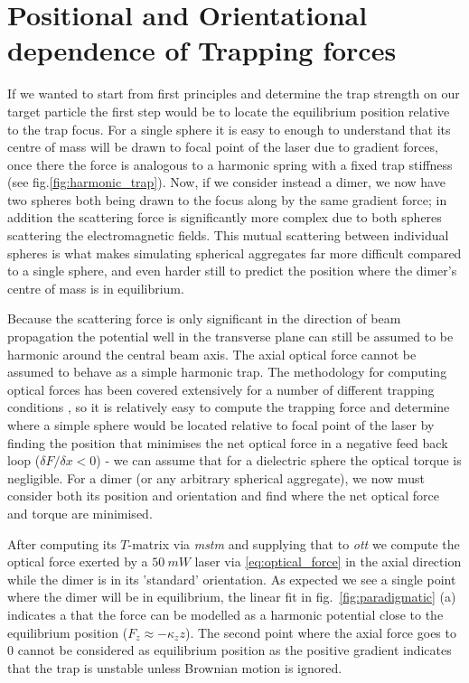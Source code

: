 \section{Positional and Orientational dependence of Trapping forces}
\label{sec:eq_positions}
If we wanted to start from first principles and determine the trap strength 
on our target particle the first step would be to locate the equilibrium position
relative to the trap focus. For a single sphere it is easy to enough to understand 
that its centre of mass will be drawn to focal point of the laser due to gradient
forces, once there the force is analogous to a harmonic spring with a fixed trap
stiffness (see fig.\ref{fig:harmonic_trap}). Now, if we consider instead a dimer, 
we now have two spheres both being drawn to the focus along by the same gradient 
force; in addition the scattering force is significantly more complex due to both 
spheres scattering the electromagnetic fields. This mutual scattering between individual 
spheres is what makes simulating spherical aggregates far more difficult compared
to a single sphere, and even harder still to predict the position where the dimer's 
centre of mass is in equilibrium.

Because the scattering force is only significant in the direction of beam 
propagation the potential well in the transverse plane can still be assumed 
to be harmonic around the central beam axis. The axial optical force cannot 
be assumed to behave as a simple harmonic trap. The methodology for computing 
optical forces has been covered extensively for a number of different trapping 
conditions \cite{RanhaNeves2019}, so it is relatively easy to compute the 
trapping force and determine where a simple sphere would be located relative 
to focal point of the laser by finding the position that minimises the net 
optical force in a negative feed back loop ($\delta F/\delta x < 0$) - we can 
assume that for a dielectric sphere the optical torque is negligible. For a 
dimer (or any arbitrary spherical aggregate), we now must consider both its 
position and orientation and find where the net optical force and torque are 
minimised. 

After computing its $T$-matrix via \textit{mstm} and supplying that 
to \textit{ott} we compute the optical force exerted by a $50\ mW$ laser
via \eqref{eq:optical_force} in the axial direction while the dimer is 
in its 'standard' orientation. As expected we see a single point where 
the dimer will be in equilibrium, the linear fit in fig.~\ref{fig:paradigmatic}
(a) indicates a that the force can be modelled as a harmonic potential close 
to the equilibrium position ($F_z\approx-\kappa_z z$). The second point 
where the axial force goes to 0 cannot be considered as equilibrium position 
as the positive gradient indicates that the trap is unstable unless Brownian 
motion is ignored. 

